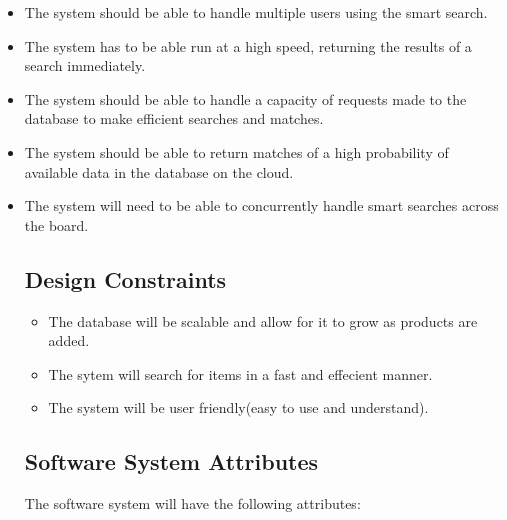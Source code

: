 \documentclass[a4paper,10pt]{article}
\begin{document}
		\begin{itemize}
		\item The system should be able to handle multiple users using the smart search.\\
		\item The system has to be able run at a high speed, returning the results of a search immediately.\\
		\item The system should be able to handle a capacity of requests made to the database to make efficient searches and matches. \\
		\item The system should be able to return matches of a high probability of available data in the database on the cloud.\\
		\item The system will need to be able to concurrently handle smart searches across the board.
		
	\subsection{Design Constraints}
	\begin{itemize}
		\item The database will be scalable and allow for it to grow as products are added.
		\item The sytem will search for items in a fast and effecient manner.
		\item The system will be user friendly(easy to use and understand).
	\end{itemize}

	\subsection{Software System Attributes}
	The software system will have the following attributes:
		

\end{itemize}
\end{document}
